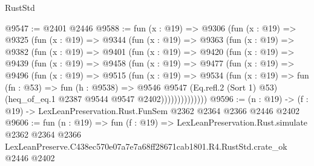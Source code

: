 \begin{lexlean}{RustStd}
\begin{coremodule}
@9547 := @2401 @2446
@9588 := fun (x : @19) =>
  @9306
    (fun (x : @19) =>
    @9325
      (fun (x : @19) =>
      @9344
        (fun (x : @19) =>
        @9363
          (fun (x : @19) =>
          @9382
            (fun (x : @19) =>
            @9401
              (fun (x : @19) =>
              @9420
                (fun (x : @19) =>
                @9439
                  (fun (x : @19) =>
                  @9458
                    (fun (x : @19) =>
                    @9477
                      (fun (x : @19) =>
                      @9496
                        (fun (x : @19) =>
                        @9515
                          (fun (x : @19) =>
                          @9534
                            (fun (x : @19) =>
                            fun (fn : @53) =>
                            fun (h : @9538) =>
                            @9546
                              @9547
                              (Eq.refl.{2} (Sort 1) @53)
                              (heq_of_eq.{1} @2387 @9544 @9547 @2402))))))))))))))
@9596 := (n : @19) -> (f : @19) -> LexLeanPreservation.Rust.FunSem @2362 @2364 @2366 @2446 @2402
@9606 := fun (n : @19) =>
  fun (f : @19) =>
  LexLeanPreservation.Rust.simulate
    @2362
    @2364
    @2366
    LexLeanPreserve.C438ec570e07a7e7a68ff28671cab1801.R4.RustStd.crate_ok
    @2446
    @2402
\end{coremodule}
\end{lexlean}
